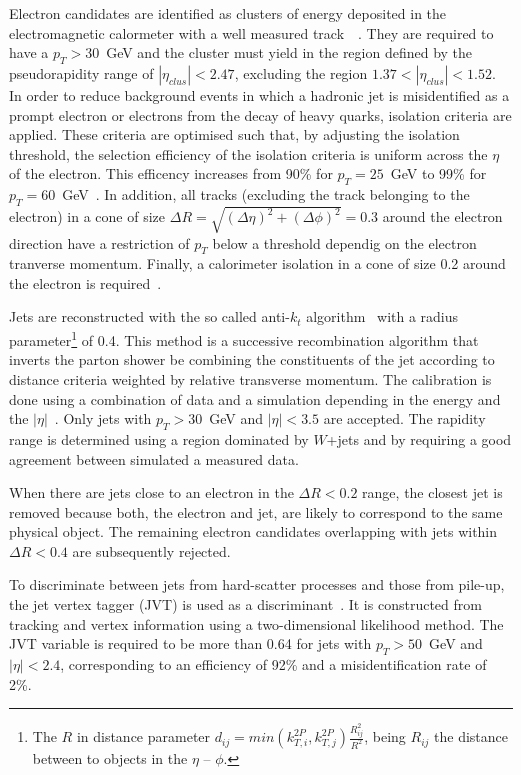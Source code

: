 Electron candidates are identified as clusters of energy deposited in the electromagnetic calormeter with a well measured track~\cite{Aad:2014fxa}~\cite{ATLAS:2014wga}. They are required to have a $p_T > 30$~GeV and the cluster must yield in the region defined by the pseudorapidity range of $|\eta_{clus}|<2.47$, excluding the region $1.37<|\eta_{clus}|<1.52$. In order to reduce background events in which a hadronic jet is misidentified as a prompt electron or electrons from the decay of heavy quarks, isolation criteria are applied. These criteria are optimised such that, by adjusting the isolation threshold, the selection efficiency of the isolation criteria is uniform across the $\eta$ of the electron. This efficency increases from 90\% for $p_T = 25$~GeV to 99\% for $p_T = 60$~GeV~\cite{Aaboud:2016ymp}. In addition, all tracks (excluding the track belonging to the electron) in a cone of size $\Delta R = \sqrt{(\Delta \eta)^2+(\Delta \phi)^2} = 0.3$ around the electron direction have a restriction of $p_T$ below a threshold dependig on the electron tranverse momentum. Finally, a calorimeter isolation in a cone of size 0.2 around the electron is required~\cite{Aaboud:2016pbd}.

Jets are reconstructed with the so called anti-$k_t$ algorithm~\cite{Cacciari:2008gp} with a radius parameter\footnote{The $R$ in distance parameter $d_{ij} = min(k_{T,i}^{2P},k_{T,j}^{2P})\frac{R^2_{ij}}{R^2}$, being $R_{ij}$ the distance between to objects in the $\eta$ -- $\phi$.} of 0.4. This method is a successive recombination algorithm that inverts the parton shower be combining the constituents of the jet according to distance criteria weighted by relative transverse momentum. The calibration is done using a combination of data and a simulation depending in the energy and the $|\eta|$~\cite{TheATLAScollaboration:2015soq}. Only jets with $p_T > 30$~GeV and $|\eta|<3.5$ are accepted. The rapidity range is determined using a region dominated by $W$+jets and by requiring a good agreement between simulated a measured data.

When there are jets close to an electron in the $\Delta R < 0.2$ range, the closest jet is removed because both, the electron and jet, are likely to correspond to the same physical object. The remaining electron candidates overlapping with jets within $\Delta R < 0.4$ are subsequently rejected. 

To discriminate between jets from hard-scatter processes and those from pile-up, the jet vertex tagger (JVT) is used as a discriminant~\cite{Aad:2015ina}. It is constructed from tracking and vertex information using a two-dimensional likelihood method. The JVT variable is required to be more than 0.64 for jets with $p_T > 50$~GeV and $|\eta|<2.4$, corresponding to an efficiency of 92\% and a misidentification rate of 2\%.

